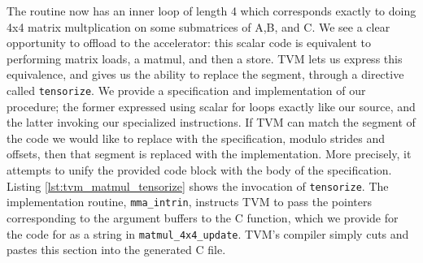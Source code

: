 \documentclass[acmsmall, nonacm=true]{acmart}
\begin{document}
The routine now has an inner loop of length 4 which corresponds exactly to doing 4x4 matrix multplication on some submatrices of A,B, and C. We see a clear opportunity to offload to the accelerator: this scalar code is equivalent to performing matrix loads, a matmul, and then a store. TVM lets us express this equivalence, and gives us the ability to replace the segment, through a directive called \verb|tensorize|. We provide a specification and implementation of our procedure; the former expressed using scalar for loops exactly like our source, and the latter invoking our specialized instructions. If TVM can match the segment of the code we would like to replace with the specification, modulo strides and offsets, then that segment is replaced with the implementation. More precisely, it attempts to unify the provided code block with the body of the specification. Listing \ref{lst:tvm_matmul_tensorize} shows the invocation of \verb|tensorize|. The implementation routine, \verb|mma_intrin|, instructs TVM to pass the pointers corresponding to the argument buffers to the C function, which we provide for the code for as a string in \verb|matmul_4x4_update|. TVM's compiler simply cuts and pastes this section into the generated C file.
\end{document}

